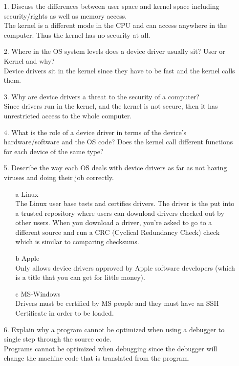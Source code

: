 \documentclass{report}
\begin{document}
\begin{enumerate}
\item[1.]Discuss the differences between user space and kernel space including security/rights as well as memory access.\\
	The kernel is a different mode in the CPU and can access anywhere in the computer. Thus the kernel has no security at all.

\item[2.]Where in the OS system levels does a device driver usually sit? User or Kernel and why?\\
	Device drivers sit in the kernel since they have to be fast and the kernel calls them.

\item[3.]Why are device drivers a threat to the security of a computer?\\
	Since drivers run in the kernel, and the kernel is not secure, then it has unrestricted access to the whole computer.

\item[4.]What is the role of a device driver in terms of the device's hardware/software and the OS code? Does the kernel call different functions for each device of the same type?\\
	


\item[5.]Describe the way each OS deals with device drivers as far as not having viruses and doing their job correctly.\\
	\begin{enumerate}
	\item[a] Linux\\
			The Linux user base tests and certifies drivers. The driver is the put into a trusted repository where users can download drivers checked out by other users. When you download a driver, you're asked to go to a different source and run a CRC (Cyclical Redundancy Check) check which is similar to comparing checksums.
	\item[b] Apple\\
			Only allows device drivers approved by Apple software developers (which is a title that you can get for little money).
	\item[c] MS-Windows\\
			Drivers must be certified by MS people and they must have an SSH Certificate in order to be loaded.
	\end{enumerate}

\item[6.]Explain why a program cannot be optimized when using a debugger to single step through the source code.\\
	Programs cannot be optimized when debugging since the debugger will change the machine code that is translated from the program.


\end{enumerate}
\end{document}
